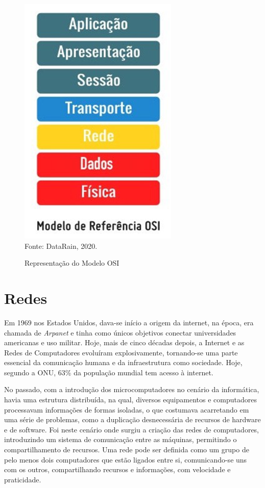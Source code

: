 \begin{figure}[htbp]
	\centering
	\caption{Representação do Modelo OSI}
	\includegraphics[]{imagens/modelo-osi.png}
	{\\Fonte: DataRain, 2020.}
	\label{fig:criação_1}
\end{figure}
\newpage\thispagestyle{empty}
\section{\textbf{Redes}}

\par Em 1969 nos Estados Unidos, dava-se início a origem da internet, na época, era chamada de \textit{Arpanet} e tinha como únicos objetivos conectar universidades americanas e uso militar. Hoje, mais de cinco décadas depois, a Internet e as Redes de Computadores evoluíram explosivamente, tornando-se uma parte essencial da comunicação humana e da infraestrutura como sociedade. Hoje, segundo a ONU, 63\% da população mundial tem acesso à internet.

\par No passado, com a introdução dos microcomputadores no cenário da informática, havia uma estrutura distribuída, na qual, diversos equipamentos e computadores processavam informações de formas isoladas, o que costumava acarretando em uma série de problemas, como a duplicação desnecessária de recursos de hardware e de software. Foi neste cenário onde surgiu a criação das redes de computadores, introduzindo um sistema de comunicação entre as máquinas, permitindo o compartilhamento de recursos.  Uma rede pode ser definida como  um grupo de pelo menos dois computadores que estão ligados entre si, comunicando-se uns com os outros, compartilhando recursos e informações, com velocidade e praticidade.

